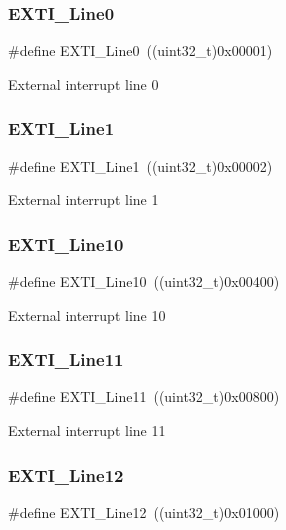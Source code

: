 \subsubsection{\texorpdfstring{EXTI\_Line0}{EXTI\_Line0}}
{\footnotesize\ttfamily \#define E\+X\+T\+I\+\_\+\+Line0~((uint32\+\_\+t)0x00001)}

External interrupt line 0 \mbox{\label{group___e_x_t_i___lines_gae7c6ab2a0880ce3810641ee0585104cd}} 
\subsubsection{\texorpdfstring{EXTI\_Line1}{EXTI\_Line1}}
{\footnotesize\ttfamily \#define E\+X\+T\+I\+\_\+\+Line1~((uint32\+\_\+t)0x00002)}

External interrupt line 1 \mbox{\label{group___e_x_t_i___lines_gaefb90b266f5fc1571ed4606bbff1f1d7}} 
\subsubsection{\texorpdfstring{EXTI\_Line10}{EXTI\_Line10}}
{\footnotesize\ttfamily \#define E\+X\+T\+I\+\_\+\+Line10~((uint32\+\_\+t)0x00400)}

External interrupt line 10 \mbox{\label{group___e_x_t_i___lines_ga6157b34c53e9b5cb8ee0d7ac3f5ba292}} 
\subsubsection{\texorpdfstring{EXTI\_Line11}{EXTI\_Line11}}
{\footnotesize\ttfamily \#define E\+X\+T\+I\+\_\+\+Line11~((uint32\+\_\+t)0x00800)}

External interrupt line 11 \mbox{\label{group___e_x_t_i___lines_gab73a0a31f1814118955099b9dd3bdfef}} 
\subsubsection{\texorpdfstring{EXTI\_Line12}{EXTI\_Line12}}
{\footnotesize\ttfamily \#define E\+X\+T\+I\+\_\+\+Line12~((uint32\+\_\+t)0x01000)}

